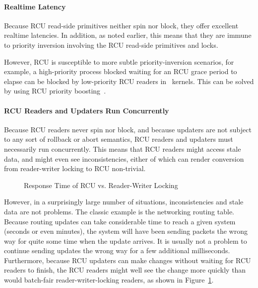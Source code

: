 \QuickQuizEnd

\paragraph{Realtime Latency}

Because RCU read-side primitives neither spin nor block, they offer
excellent realtime latencies.
In addition, as noted earlier, this means that they are
immune to priority inversion
involving the RCU read-side primitives and locks.

However, RCU is susceptible to more subtle priority-inversion scenarios,
for example, a high-priority process blocked waiting for an RCU
grace period to elapse can be blocked by low-priority RCU readers
in \rt\ kernels.
This can be solved by using RCU priority
boosting~\cite{PaulEMcKenney2007BoostRCU,DinakarGuniguntala2008IBMSysJ}.

\paragraph{RCU Readers and Updaters Run Concurrently}

Because RCU readers never spin nor block, and because updaters are not
subject to any sort of rollback or abort semantics, RCU readers and
updaters must necessarily run concurrently.
This means that RCU readers might access stale data, and might even
see inconsistencies, either of which can render conversion from reader-writer
locking to RCU non-trivial.

\begin{figure}[tb]
\centering
{}
\caption{Response Time of RCU vs. Reader-Writer Locking}
\label{fig:defer:Response Time of RCU vs. Reader-Writer Locking}
\end{figure}

However, in a surprisingly large number of situations, inconsistencies and
stale data are not problems.
The classic example is the networking routing table.
Because routing updates can take considerable time to reach a given
system (seconds or even minutes), the system will have been sending
packets the wrong way for quite some time when the update arrives.
It is usually not a problem to continue sending updates the wrong
way for a few additional milliseconds.
Furthermore, because RCU updaters can make changes without waiting for
RCU readers to finish,
the RCU readers might well see the change more quickly than would
batch-fair
reader-writer-locking readers, as shown in
Figure~\ref{fig:defer:Response Time of RCU vs. Reader-Writer Locking}.

